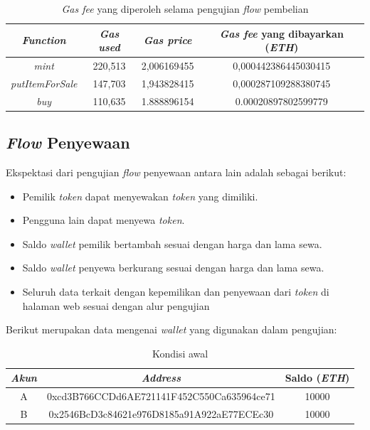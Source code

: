 \begin{longtable}{|c|c|c|c|}
    \caption{\emph{Gas fee} yang diperoleh selama pengujian \emph{flow} pembelian}
    \label{tb:EnergiKecepatan}                                   \\
    \hline
    \rowcolor[HTML]{C0C0C0}
    \textbf{\emph{Function}}  & \textbf{\emph{Gas used}} & \textbf{\emph{Gas price}}  & \textbf{\emph{Gas fee} yang dibayarkan (\emph{ETH})} \\
    \hline
    \emph{mint}           & 220,513 & 2,006169455  & 0,000442386445030415    \\
    \emph{putItemForSale} & 147,703 & 1,943828415  & 0,000287109288380745    \\
    \emph{buy}            & 110,635 & 1.888896154  & 0.00020897802599779      \\
    \hline
  \end{longtable}

\subsection{\emph{Flow} Penyewaan}

Ekspektasi dari pengujian \emph{flow} penyewaan antara lain adalah sebagai berikut:
\begin{itemize}
    \item Pemilik \emph{token} dapat menyewakan \emph{token} yang dimiliki.
    \item Pengguna lain dapat menyewa \emph{token}.
    \item Saldo \emph{wallet} pemilik bertambah sesuai dengan harga dan lama sewa.
    \item Saldo \emph{wallet} penyewa berkurang sesuai dengan harga dan lama sewa.
    \item Seluruh data terkait dengan kepemilikan dan penyewaan dari \emph{token} di halaman web sesuai dengan alur pengujian  
\end{itemize}

Berikut merupakan data mengenai \emph{wallet} yang digunakan dalam pengujian:

\begin{longtable}{|c|c|c|}
    \caption{Kondisi awal}
    \label{tb:KondisiAwalPengujianSewa}                                   \\
    \hline
    \rowcolor[HTML]{C0C0C0}
    \textbf{\emph{Akun}} & \textbf{\emph{Address}} & \textbf{Saldo (\emph{ETH})}\\
    \hline
    A & 0xcd3B766CCDd6AE721141F452C550Ca635964ce71            & 10000               \\
    B & 0x2546BcD3c84621e976D8185a91A922aE77ECEc30            & 10000               \\
    \hline
  \end{longtable}

